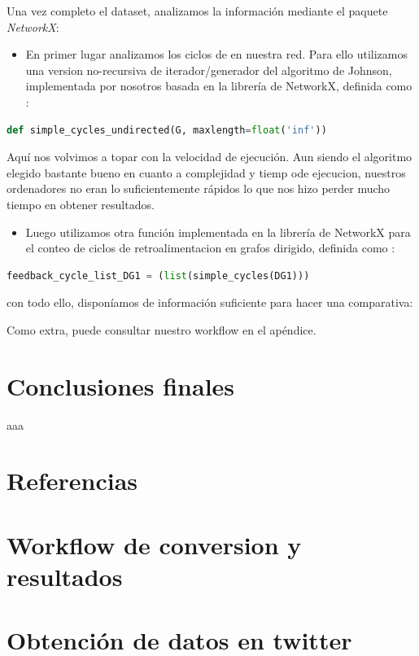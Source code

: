 \documentclass[1p]{elsarticle}
\begin{document}
Una vez completo el dataset, analizamos la información mediante el paquete  \textit{NetworkX}:
\begin{itemize}
	\item En primer lugar analizamos  los ciclos de en nuestra red. Para ello utilizamos una version no-recursiva de iterador/generador del algoritmo de Johnson, implementada por nosotros basada en la librería de NetworkX, definida como :
\end{itemize}

	\begin{lstlisting}[language=Python]
	def simple_cycles_undirected(G, maxlength=float('inf'))\end{lstlisting}
Aquí nos volvimos a topar con la velocidad de ejecución. Aun siendo el algoritmo elegido bastante bueno en cuanto a complejidad y tiemp ode ejecucion, nuestros ordenadores no eran lo suficientemente rápidos lo que nos hizo perder mucho tiempo en obtener resultados.
\begin{itemize}
	\item Luego utilizamos otra función implementada en la librería de NetworkX para el conteo de ciclos de retroalimentacion en grafos dirigido, definida como :
\end{itemize}


\begin{lstlisting}[language=Python]
feedback_cycle_list_DG1 = (list(simple_cycles(DG1)))\end{lstlisting}
 
con todo ello, disponíamos de información suficiente para hacer una comparativa:



Como extra, puede consultar nuestro workflow en el apéndice.



\section{Conclusiones finales}
aaa



\section*{Referencias}


\begin{appendices}
	
	\section{Workflow de conversion y resultados}
	
\section{Obtención de datos en twitter}

\end{appendices}
\end{document}
